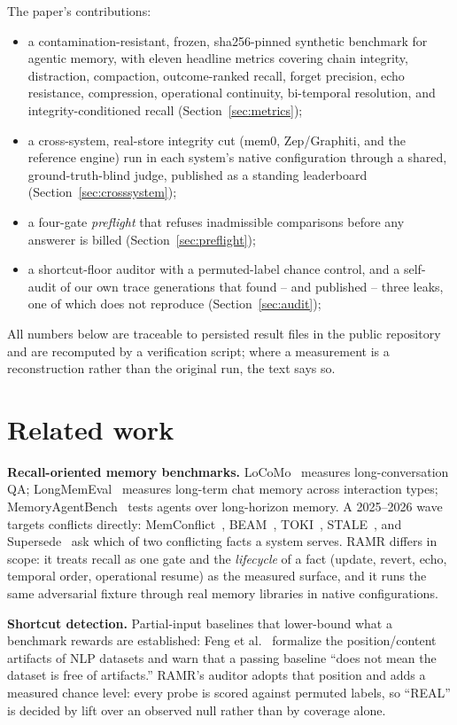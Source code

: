 \documentclass[11pt]{article}
\begin{document}
The paper's contributions:
\begin{itemize}
\item a contamination-resistant, frozen, sha256-pinned synthetic benchmark for agentic memory, with
eleven headline metrics covering chain integrity, distraction, compaction, outcome-ranked recall,
forget precision, echo resistance, compression, operational continuity, bi-temporal resolution, and
integrity-conditioned recall (Section~\ref{sec:metrics});
\item a cross-system, real-store integrity cut (mem0, Zep/Graphiti, and the reference engine) run in
each system's native configuration through a shared, ground-truth-blind judge, published as a standing
leaderboard (Section~\ref{sec:crosssystem});
\item a four-gate \emph{preflight} that refuses inadmissible comparisons before any answerer is billed
(Section~\ref{sec:preflight});
\item a shortcut-floor auditor with a permuted-label chance control, and a self-audit of our own trace
generations that found -- and published -- three leaks, one of which does not reproduce (Section~\ref{sec:audit});
\end{itemize}

All numbers below are traceable to persisted result files in the public repository and are recomputed
by a verification script; where a measurement is a reconstruction rather than the original run, the
text says so.

\section{Related work}
\label{sec:related}

\textbf{Recall-oriented memory benchmarks.} LoCoMo~\cite{locomo} measures long-conversation QA;
LongMemEval~\cite{longmemeval} measures long-term chat memory across interaction types;
MemoryAgentBench~\cite{memoryagentbench} tests agents over long-horizon memory. A 2025--2026 wave
targets conflicts directly: MemConflict~\cite{memconflict}, BEAM~\cite{beam}, TOKI~\cite{toki},
STALE~\cite{stale}, and Supersede~\cite{supersede} ask which of two conflicting facts a system serves.
RAMR differs in scope: it treats recall as one gate and the \emph{lifecycle} of a fact (update, revert,
echo, temporal order, operational resume) as the measured surface, and it runs the same adversarial
fixture through real memory libraries in native configurations.

\textbf{Shortcut detection.} Partial-input baselines that lower-bound what a benchmark rewards are
established: Feng et al.~\cite{feng2019} formalize the position/content artifacts of NLP datasets and
warn that a passing baseline ``does not mean the dataset is free of artifacts.'' RAMR's auditor adopts
that position and adds a measured chance level: every probe is scored against permuted labels, so
``REAL'' is decided by lift over an observed null rather than by coverage alone.
\end{document}
